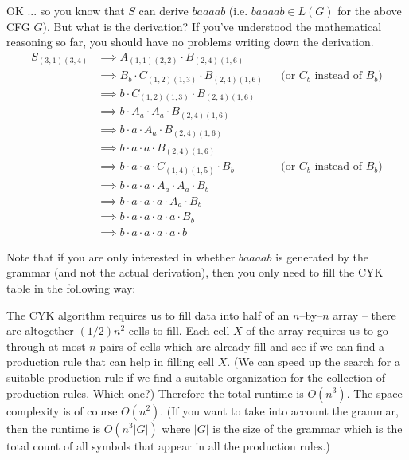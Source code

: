 OK ... so you know that $S$ can derive $baaaab$ (i.e.
$baaaab \in L(G)$ for the above CFG $G$).
But what is the derivation?
If you've understood the mathematical reasoning so far,
you should have no problems writing down the derivation.
\newcommand\ddd{&\implies}
\begin{align*}
  S_{(3,1)(3,4)}
  &\implies A_{(1,1)(2,2)} \cdot B_{(2,4)(1,6)} \\
  &\implies B_b \cdot C_{(1,2)(1,3)} \cdot B_{(2,4)(1,6)} & & \text{(or $C_b$ instead of $B_b$)} \\
  &\implies b \cdot C_{(1,2)(1,3)} \cdot B_{(2,4)(1,6)} \\
  &\implies b \cdot A_a \cdot A_a \cdot B_{(2,4)(1,6)} \\
  &\implies b \cdot a \cdot A_a \cdot B_{(2,4)(1,6)} \\
  &\implies b \cdot a \cdot a \cdot B_{(2,4)(1,6)} \\
  &\implies b \cdot a \cdot a \cdot C_{(1,4)(1,5)} \cdot B_b & &  \text{(or $C_b$ instead of $B_b$)} \\
  &\implies b \cdot a \cdot a \cdot A_a \cdot A_a \cdot B_b \\
  &\implies b \cdot a \cdot a \cdot a \cdot A_a \cdot B_b \\
  &\implies b \cdot a \cdot a \cdot a \cdot a \cdot B_b \\
  &\implies b \cdot a \cdot a \cdot a \cdot a \cdot b
\end{align*}

Note that if you are only interested in whether $baaaab$ is generated by the grammar
(and not the actual derivation), then you only need to fill the CYK table in
the following way:


The CYK algorithm requires us to fill data into half of an $n$--by--$n$
array -- there are altogether $(1/2)n^2$ cells to fill.
Each cell $X$ of the array requires us to go through at most $n$ pairs
of cells which are already fill and see if we can find a production rule
that can help in filling cell $X$.
(We can speed up the search for a suitable production rule
if we find a suitable organization for the collection
of production rules. Which one?)
Therefore the total runtime is $O(n^3)$.
The space complexity is of course $\Theta(n^2)$.
(If you want to take into account the grammar, then the runtime is
$O(n^3 |G|)$ where $|G|$ is the size of the grammar
which is the total count of all symbols that appear
in all the production rules.)



